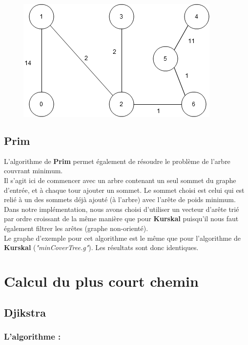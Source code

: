 \documentclass[12pt]{article}
\begin{document}
\begin{figure}[h]
\centering
\includegraphics[scale=.7]{imgs/schema2.png}
\end{figure}

\clearpage
\subsection{Prim}

L'algorithme de {\bf Prim} permet également de résoudre le problème de l'arbre couvrant minimum. \\ 

Il s'agit ici de commencer avec un arbre contenant un seul sommet du graphe d'entrée, et à chaque tour ajouter un sommet. Le sommet choisi est celui qui est relié à un des sommets déjà ajouté (à l'arbre) avec l'arête de poids minimum. \\ 

Dans notre implémentation, nous avons choisi d'utiliser un vecteur d'arête trié par ordre croissant de la même manière que pour {\bf Kurskal} puisqu'il nous faut également filtrer les arêtes (graphe non-orienté). \\

Le graphe d'exemple pour cet algorithme est le même que pour l'algorithme de {\bf Kurskal} ({\it "minCoverTree.g"}). Les résultats sont donc identiques. \\

\clearpage
\section{Calcul du plus court chemin}
\subsection{Djikstra}
\subsubsection{L'algorithme :}
\end{document}
